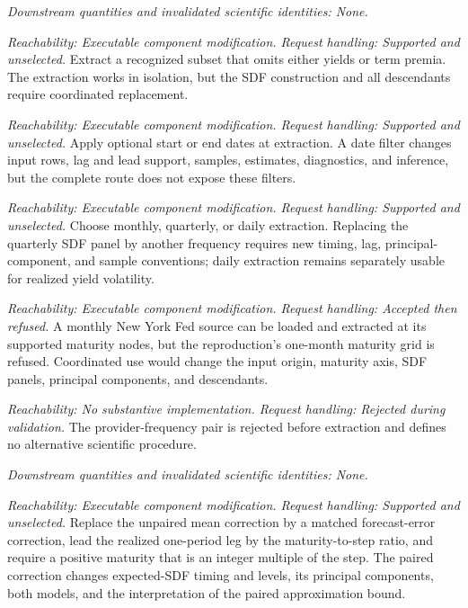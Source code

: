 \documentclass[11pt]{article}
\begin{document}
\begin{description}[style=nextline]
\emph{Downstream quantities and invalidated scientific identities: None.}

\item[Single-family Treasury extraction.]
\emph{Reachability: Executable component modification. Request handling: Supported and unselected.}
Extract a recognized subset that omits either yields or term premia. The extraction works in
isolation, but the SDF construction and all descendants require coordinated replacement.

\item[Treasury date filters.]
\emph{Reachability: Executable component modification. Request handling: Supported and unselected.}
Apply optional start or end dates at extraction. A date filter changes input rows, lag and lead support,
samples, estimates, diagnostics, and inference, but the complete route does not expose these filters.

\item[Treasury observation frequency.]
\emph{Reachability: Executable component modification. Request handling: Supported and unselected.}
Choose monthly, quarterly, or daily extraction. Replacing the quarterly SDF panel by another
frequency requires new timing, lag, principal-component, and sample conventions; daily extraction
remains separately usable for realized yield volatility.

\item[New York Fed monthly source.]
\emph{Reachability: Executable component modification. Request handling: Accepted then refused.}
A monthly New York Fed source can be loaded and extracted at its supported maturity nodes, but the
reproduction's one-month maturity grid is refused. Coordinated use would change the input origin, maturity
axis, SDF panels, principal components, and descendants.

\item[New York Fed daily source.]
\emph{Reachability: No substantive implementation. Request handling: Rejected during validation.}
The provider-frequency pair is rejected before extraction and defines no alternative scientific
procedure.

\emph{Downstream quantities and invalidated scientific identities: None.}

\item[Paired expected-SDF correction.]
\emph{Reachability: Executable component modification. Request handling: Supported and unselected.}
Replace the unpaired mean correction by a matched forecast-error correction, lead the realized
one-period leg by the maturity-to-step ratio, and require a positive maturity that is an integer
multiple of the step. The paired correction changes expected-SDF timing and levels, its principal components, both
models, and the interpretation of the paired approximation bound.


\end{description}
\end{document}
